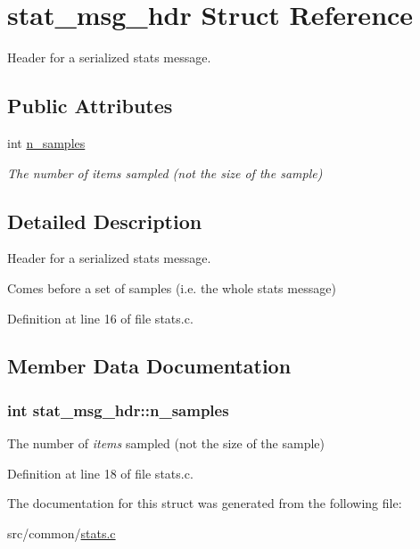 \hypertarget{structstat__msg__hdr}{\section{stat\-\_\-msg\-\_\-hdr Struct Reference}
\label{structstat__msg__hdr}
}


Header for a serialized stats message.  


\subsection*{Public Attributes}
\begin{DoxyCompactItemize}
\item 
int \hyperlink{structstat__msg__hdr_a9fc1e11955b79c568df90e50b68b44b5}{n\-\_\-samples}
\begin{DoxyCompactList}\small\item\em The number of {\itshape items} sampled (not the size of the sample) \end{DoxyCompactList}\end{DoxyCompactItemize}


\subsection{Detailed Description}
Header for a serialized stats message. 

Comes before a set of samples (i.\-e. the whole stats message) 

Definition at line 16 of file stats.\-c.



\subsection{Member Data Documentation}
\hypertarget{structstat__msg__hdr_a9fc1e11955b79c568df90e50b68b44b5}{
\subsubsection[{n\-\_\-samples}]{\setlength{\rightskip}{0pt plus 5cm}int stat\-\_\-msg\-\_\-hdr\-::n\-\_\-samples}}\label{structstat__msg__hdr_a9fc1e11955b79c568df90e50b68b44b5}


The number of {\itshape items} sampled (not the size of the sample) 



Definition at line 18 of file stats.\-c.



The documentation for this struct was generated from the following file\-:\begin{DoxyCompactItemize}
\item 
src/common/\hyperlink{stats_8c}{stats.\-c}\end{DoxyCompactItemize}
